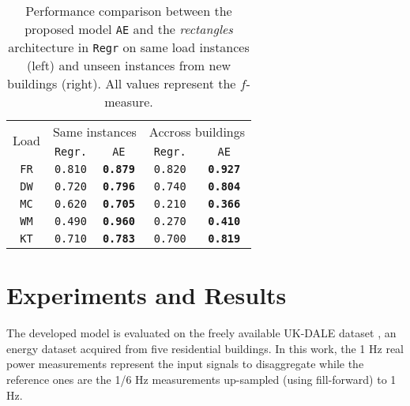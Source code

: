 \documentclass[twocolumn,letter,10pt]{IEEEtran} %
\begin{document}
\begin{table}[!t]
	\begin{center}
		\caption{Performance comparison between the proposed model \texttt{AE} and the \emph{rectangles} architecture in \cite{Kelly_2015} \texttt{Regr} on same load instances (left) and unseen instances from new buildings (right). All values represent the $f$-measure.}
		\label{tbl:across-loads}
		\setlength\intextsep{0mm}
		\setlength{\tabcolsep}{10pt}
		\footnotesize
		\newcommand{\fscore}{\texttt{f}$_\texttt{1}$\texttt{-s}}
		\newcommand{\wrst}[1]{\texttt{#1}}
		\newcommand{\best}[1]{\textbf{\texttt{#1}}}
		\begin{tabularx}{0.94\columnwidth}{c|cc|cc}
			\toprule
			\multirow{2}{*}{Load}	&				\multicolumn{2}{c}{Same instances} 					&		\multicolumn{2}{c}{Accross buildings} 				\\
			\cmidrule(lr){2-3}
			\cmidrule(lr){4-5}
			&	\texttt{Regr.} \cite{Kelly_2015}	&		\texttt{AE}		&		\texttt{Regr.} \cite{Kelly_2015}		& \texttt{AE}	\\
			\midrule
			\texttt{FR}				&		\wrst{0.810} 					&		\best{0.879}		&			\wrst{0.820} 					& \best{0.927}	\\
			\texttt{DW}				&		\wrst{0.720} 					&		\best{0.796}		&			\wrst{0.740} 					& \best{0.804}	\\
			\texttt{MC}				&		\wrst{0.620} 					&		\best{0.705}		&			\wrst{0.210} 					& \best{0.366}	\\
			\texttt{WM}				&		\wrst{0.490} 					&		\best{0.960}		&			\wrst{0.270} 					& \best{0.410}	\\
			\texttt{KT}				&		\wrst{0.710} 					&		\best{0.783}		&			\wrst{0.700} 					& \best{0.819}	\\
			\bottomrule
		\end{tabularx}
	\end{center}
\end{table}


\section{Experiments and Results}
\label{sec:experiments-and-results}

The developed model is evaluated on the freely available UK-DALE dataset \cite{Kelly_2015_UKDALE}, an energy dataset acquired from five residential buildings.
In this work, the 1 Hz real power measurements represent the input signals to disaggregate while the reference ones are the 1/6 Hz measurements up-sampled (using fill-forward) to 1 Hz.
\end{document}
